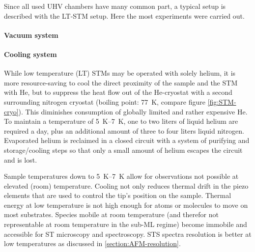 Since all used UHV chambers have many common part, a typical setup is described with the LT-STM setup. Here the most experiments were carried out.

\paragraph{Vacuum system}
\paragraph{Cooling system} 
While low temperature (LT) STMs may be operated with solely helium, it is more resource-saving to cool the direct proximity of the sample and the STM with He, but to suppress the heat flow out of the He-cryostat with a second surrounding nitrogen cryostat (boiling point: \SI{77}{\K}, compare figure \ref{fig:STM-cryo}). This diminishes consumption of globally limited and rather expensive He. To maintain a temperature of \SIrange{5}{7}{\K}, one to two liters of liquid helium are required a day, plus an additional amount of three to four liters liquid nitrogen. Evaporated helium is reclaimed in a closed circuit with a system of purifying and storage/cooling steps so that only a small amount of helium escapes the circuit and is lost.

Sample temperatures down to \SIrange{5}{7}{\K} allow for observations not possible at elevated (room) temperature. Cooling not only reduces thermal drift in the piezo elements that are used to control the tip's position on the sample. Thermal energy at low temperature is not high enough for atoms or molecules to move on most substrates. Species mobile at room temperature (and therefor not representable at room temperature in the sub-ML regime) become immobile and accessible for ST microscopy and spectroscopy. STS spectra resolution is better at low temperatures as discussed in \ref{section:AFM-resolution}.

